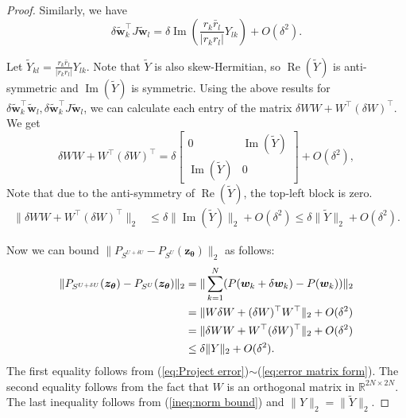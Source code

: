 \documentclass[10pt,a4paper]{amsart}
\newcommand{\RR}{\mathbb{R}}
\begin{document}
\begin{proof}
Similarly, we have 
\begin{equation}
    \delta\tilde{\bm{w}}_k^\top J\tilde{\bm{w}}_l=\delta\operatorname{Im}(\frac{r_k\bar r_l}{|r_kr_l|}Y_{lk})+O(\delta^2).
\end{equation}

Let $\tilde Y_{kl}=\frac{r_k\bar r_l}{|r_kr_l|}Y_{lk}$. Note that $\tilde Y$ is also skew-Hermitian, so $\operatorname{Re}(\tilde Y)$ is anti-symmetric and $\operatorname{Im}(\tilde Y)$ is symmetric. Using the above results for  $\delta\tilde{\bm{w}}_k^\top \tilde{\bm{w}}_l,\delta\tilde{\bm{w}}_k^\top J\tilde{\bm{w}}_l$, we can calculate each entry of the matrix $\delta W W+W^\top(\delta W)^\top$. We get
\begin{equation}
    \delta W W+W^\top(\delta W)^\top=\delta \begin{bmatrix}
    0&\operatorname{Im}(\tilde Y)\\
   \operatorname{Im}(\tilde Y)&0
\end{bmatrix}+O(\delta^2),
\end{equation}
Note that due to the anti-symmetry of $\operatorname{Re}(\tilde Y)$, the top-left block is zero.
\begin{align}
\label{ineq:norm bound}
   \|\delta WW+W^\top(\delta W)^\top\|_2&\leq\delta\|\operatorname{Im}(\tilde Y)\|_2+O(\delta^2)\leq \delta\|\tilde Y\|_2+O(\delta^2).
\end{align}

Now we can bound $\|P_{S^{U+\delta U}}-P_{S^U}(\bm{z}_{\bm\theta})\|_2$ as follows:
\begin{align}
\label{eq:final key norm bound}
    \|P_{S^{U+\delta U}}(\bm{z}_{\bm\theta})-P_{S^U}(\bm{z}_{\bm\theta})\|_2&=\|\sum\limits_{k=1}^{N}(P(\bm{w}_k+\delta\bm{w}_k)-P(\bm{w}_k))\|_2\notag\\
    &=\| W\delta W+(\delta W)^\top W^\top\|_2+O(\delta^2)\notag \\
    &=\|\delta W W+W^\top(\delta W)^\top\|_2+O(\delta^2)\notag\\
    &\leq \delta\|Y\|_2+O(\delta^2).
\end{align}
The first equality follows from (\ref{eq:Project error})$\sim$(\ref{eq:error matrix form}). The second equality follows from the fact that $W$ is an orthogonal matrix in $\RR^{2N\times 2N}$. The last inequality follows from (\ref{ineq:norm bound}) and $\|Y\|_2=\|\tilde Y\|_2$.


\end{proof}
\end{document}
